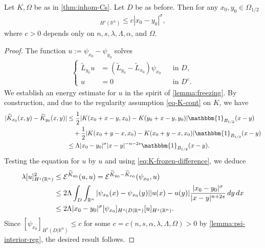 \documentclass[11pt,reqno]{amsart}
\theoremstyle{plain}
\theoremstyle{definition}
\numberwithin{equation}{section}
\newcommand{\R}{\mathbb{R}}
\newcommand{\cE}{\mathcal{E}}
\newcommand{\1}{\mathbbm{1}}
\renewcommand{\d}{\textnormal{\,d}}
\begin{document}
\begin{lemma}
\label{lemma:energy-est}
Let $K, \Omega$ be as in \autoref{thm:inhom-Cs}. Let $D$ be as before. Then for any $x_0, y_0 \in \Omega_{1/2}$
\begin{align*}
[\psi_{x_0} - \psi_{y_0}]_{H^s(\R^n)} \le c |x_0 - y_0|^{\sigma},
\end{align*}
where $c > 0$ depends only on $n,s,\lambda,\Lambda,\alpha$, and $\Omega$.
\end{lemma}

\begin{proof}
The function $u := \psi_{x_0} - \psi_{y_0}$ solves
\begin{align}\label{eq-L-y0-u}
\left\{
\begin{aligned}
\widetilde{L}_{y_0} u &= (\widetilde{L}_{y_0} - \widetilde{L}_{x_0}) \psi_{x_0} &&\text{in }D, \\
u&=0 &&\text{in } D^c.
\end{aligned}
\right.
\end{align}
We establish an energy estimate for $u$ in the spirit of \autoref{lemma:freezing}. 
By construction, and due to the regularity assumption \eqref{eq-K-cont} on $K$, we have
\begin{align}
\label{eq:K-frozen-difference}
\begin{split}
|\widetilde{K}_{x_0}(x,y) - \widetilde{K}_{y_0}(x,y)| &\le \frac{1}{2} |K(x_0 + x - y , x_0) - K(y_0 + x  - y , y_0)| \1_{B_{1/2}}(x-y) \\
&\quad + \frac{1}{2} |K(x_0 + y - x , x_0) - K(x_0 + y - x , x_0)| \1_{B_{1/2}}(x-y) \\
&\le \Lambda |x_0 - y_0|^{\sigma} |x-y|^{-n-2s} \1_{B_{1/2}}(x-y).
\end{split}
\end{align}
Testing the equation for $u$ by $u$ and using \eqref{eq:K-frozen-difference}, we deduce
\begin{align*}
\lambda [u]^2_{H^s(\R^n)} &\le \cE^{\widetilde{K}_{y_0}}(u,u) = \cE^{\widetilde{K}_{y_0} - \widetilde{K}_{x_0}}(\psi_{x_0},u) \\
&\le 2\Lambda \int_D \int_{\R^n} |\psi_{x_0}(x) - \psi_{x_0}(y)||u(x) - u(y)| \frac{|x_0-y_0|^\sigma}{|x-y|^{n+2s}} \d y \d x \\
&\le 2\Lambda |x_0 - y_0|^{\sigma} [\psi_{x_0}]_{H^s(D|\R^n)} [u]_{H^s(\R^n)}.
\end{align*}
Since $[\psi_{x_0}]_{H^s(D|\R^n)} \le c$ for some $c=c(n,s,\alpha,\lambda, \Lambda,\Omega) > 0$ by \autoref{lemma:psi-interior-reg}, the desired result follows.
\end{proof}
\end{document}
